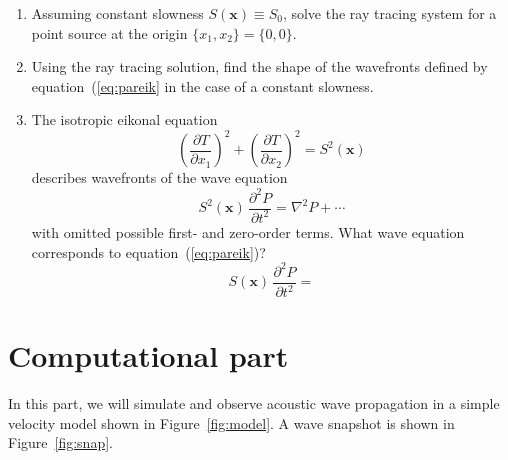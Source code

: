 \begin{enumerate}
\begin{enumerate}
   \item Assuming constant slowness $S(\mathbf{x}) \equiv S_0$, solve
    the ray tracing system for a point source at the origin
    $\{x_1,x_2\} = \{0,0\}$.

   \item Using the ray tracing solution, find the shape of the
    wavefronts defined by equation~(\ref{eq:pareik} in the case of a
    constant slowness.

   \item The isotropic eikonal equation
    \begin{equation}
      \label{eq:iso}
      \left(\frac{\partial T}{\partial x_1}\right)^2 +
      \left(\frac{\partial T}{\partial x_2}\right)^2 = S^2(\mathbf{x})
    \end{equation}
    describes wavefronts of the wave equation
    \begin{equation}
      \label{eq:isowave}
      S^2(\mathbf{x})\,\frac{\partial^2 P}{\partial t^2} =
      \nabla^2 P + \cdots
    \end{equation}
    with omitted possible first- and zero-order terms. 
    What wave equation corresponds to equation~(\ref{eq:pareik})?
    \begin{equation}
      S(\mathbf{x})\,{\frac{\partial^2 P}{\partial t^2}} =
      \label{eq:parwave}
    \end{equation}

  \end{enumerate}
\end{enumerate}

\section{Computational part}

In this part, we will simulate and observe acoustic wave propagation
in a simple velocity model shown in Figure~\ref{fig:model}. A wave
snapshot is shown in Figure~\ref{fig:snap}.


